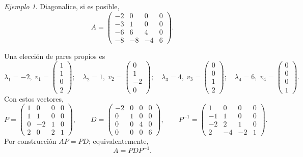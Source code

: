 \documentclass[12pt]{article}
\theoremstyle{remark}
\newtheorem{Ejem}[definicion]{Ejemplo}
\begin{document}
\begin{Ejem}


Diagonalice, si es posible,
\[
A=\begin{pmatrix}-2 & 0 & 0 & 0\\-3 & 1 & 0 & 0\\-6 & 6 & 4 & 0\\-8 & -8 & -4 & 6\end{pmatrix}.
\]

\scriptsize
Una elección de pares propios es
\[
\lambda_1=-2,\;v_1=\begin{pmatrix}1\\1\\0\\2\end{pmatrix};\quad \lambda_2=1,\;v_2=\begin{pmatrix}0\\1\\-2\\0\end{pmatrix};\quad \lambda_3=4,\;v_3=\begin{pmatrix}0\\0\\1\\2\end{pmatrix};\quad \lambda_4=6,\;v_4=\begin{pmatrix}0\\0\\0\\1\end{pmatrix}.
\]
Con estos vectores,
\[
P=\begin{pmatrix}1 & 0 & 0 & 0\\1 & 1 & 0 & 0\\0 & -2 & 1 & 0\\2 & 0 & 2 & 1\end{pmatrix},\qquad D=\begin{pmatrix}-2 & 0 & 0 & 0\\0 & 1 & 0 & 0\\0 & 0 & 4 & 0\\0 & 0 & 0 & 6\end{pmatrix},\qquad P^{-1}=\begin{pmatrix}1 & 0 & 0 & 0\\-1 & 1 & 0 & 0\\-2 & 2 & 1 & 0\\2 & -4 & -2 & 1\end{pmatrix}.
\]
Por construcción $AP=PD$; equivalentemente,
\[
\boxed{A=PDP^{-1}}.
\]

\end{Ejem}
\end{document}
